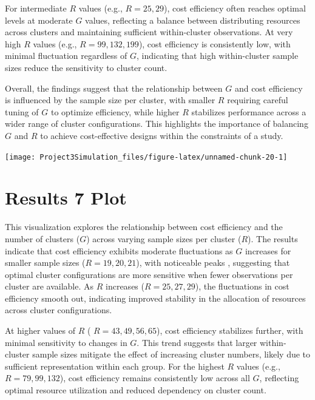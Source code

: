 \documentclass[
]{article}
\begin{document}
For intermediate \(R\) values (e.g., \(R = 25, 29\)), cost efficiency
often reaches optimal levels at moderate \(G\) values, reflecting a
balance between distributing resources across clusters and maintaining
sufficient within-cluster observations. At very high \(R\) values (e.g.,
\(R = 99, 132, 199\)), cost efficiency is consistently low, with minimal
fluctuation regardless of \(G\), indicating that high within-cluster
sample sizes reduce the sensitivity to cluster count.

Overall, the findings suggest that the relationship between \(G\) and
cost efficiency is influenced by the sample size per cluster, with
smaller \(R\) requiring careful tuning of \(G\) to optimize efficiency,
while higher \(R\) stabilizes performance across a wider range of
cluster configurations. This highlights the importance of balancing
\(G\) and \(R\) to achieve cost-effective designs within the constraints
of a study.

\begin{center}\texttt{[image: Project3Simulation\_files/figure-latex/unnamed-chunk-20-1]} \end{center}

\hypertarget{results-7-plot}{%
\section{Results 7 Plot}\label{results-7-plot}}

This visualization explores the relationship between cost efficiency and
the number of clusters (\(G\)) across varying sample sizes per cluster
(\(R\)). The results indicate that cost efficiency exhibits moderate
fluctuations as \(G\) increases for smaller sample sizes
(\(R = 19, 20, 21\)), with noticeable peaks , suggesting that optimal
cluster configurations are more sensitive when fewer observations per
cluster are available. As \(R\) increases (\(R = 25, 27, 29\)), the
fluctuations in cost efficiency smooth out, indicating improved
stability in the allocation of resources across cluster configurations.

At higher values of \(R\) ( \(R = 43, 49, 56, 65\)), cost efficiency
stabilizes further, with minimal sensitivity to changes in \(G\). This
trend suggests that larger within-cluster sample sizes mitigate the
effect of increasing cluster numbers, likely due to sufficient
representation within each group. For the highest \(R\) values (e.g.,
\(R = 79, 99, 132\)), cost efficiency remains consistently low across
all \(G\), reflecting optimal resource utilization and reduced
dependency on cluster count.
\end{document}

